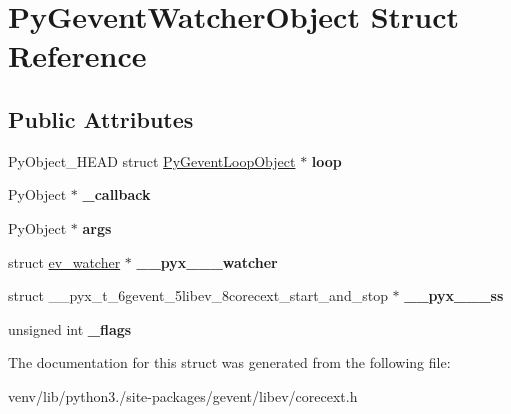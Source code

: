 \hypertarget{struct_py_gevent_watcher_object}{}\section{Py\+Gevent\+Watcher\+Object Struct Reference}
\label{struct_py_gevent_watcher_object}
\subsection*{Public Attributes}
\begin{DoxyCompactItemize}
\item 
\mbox{\label{struct_py_gevent_watcher_object_af8e8c8dbf3b04b9cc66b6dbee0b07e0e}} 
Py\+Object\+\_\+\+H\+E\+AD struct \hyperlink{struct_py_gevent_loop_object}{Py\+Gevent\+Loop\+Object} $\ast$ {\bfseries loop}
\item 
\mbox{\label{struct_py_gevent_watcher_object_a4ef17c4714a97906c566de4e9cb89ade}} 
Py\+Object $\ast$ {\bfseries \+\_\+callback}
\item 
\mbox{\label{struct_py_gevent_watcher_object_a2ba2a166b9892a203f258ce77aae3682}} 
Py\+Object $\ast$ {\bfseries args}
\item 
\mbox{\label{struct_py_gevent_watcher_object_a9c8f7d00a3c8b4230e31ad01ef164e7f}} 
struct \hyperlink{structev__watcher}{ev\+\_\+watcher} $\ast$ {\bfseries \+\_\+\+\_\+pyx\+\_\+\+\_\+\+\_\+watcher}
\item 
\mbox{\label{struct_py_gevent_watcher_object_a5af5cd3d5b7ffe507c495953826fad51}} 
struct \+\_\+\+\_\+pyx\+\_\+t\+\_\+6gevent\+\_\+5libev\+\_\+8corecext\+\_\+start\+\_\+and\+\_\+stop $\ast$ {\bfseries \+\_\+\+\_\+pyx\+\_\+\+\_\+\+\_\+ss}
\item 
\mbox{\label{struct_py_gevent_watcher_object_ae65f72cc92ab9d3baa2abb07f8b11542}} 
unsigned int {\bfseries \+\_\+flags}
\end{DoxyCompactItemize}


The documentation for this struct was generated from the following file\+:\begin{DoxyCompactItemize}
\item 
venv/lib/python3./site-\/packages/gevent/libev/corecext.\+h\end{DoxyCompactItemize}
